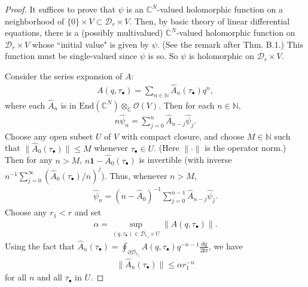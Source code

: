 \documentclass[12pt,a4paper,notitlepage]{article}
\theoremstyle{definition}
\theoremstyle{plain}
\newcommand{\mc}{\mathcal}
\newcommand{\wht}{\widehat}
\newcommand{\ovl}{\overline}
\newcommand{\End}{\mathrm{End}} %
\newcommand{\id}{\mathbf{1}}
\newcommand{\scr}{\mathscr}
\newcommand{\im}{\mathbf{i}}
\newcommand{\mbb}{\mathbb}
\newcommand{\blt}{\bullet}
\newcommand{\Cbb}{\mathbb C}
\numberwithin{equation}{section}
\begin{document}
\begin{proof}
It suffices to prove that $\psi$ is an $\Cbb^N$-valued holomorphic function on a neighborhood of $\{0\}\times V\subset\mc D_r\times V$. Then, by basic theory of linear differential equations, there is a (possibly multivalued) $\Cbb^N$-valued holomorphic function on $\mc D_r\times V$ whose ``initial value" is given by $\psi$. (See \cite{Kna} the remark after Thm. B.1.) This function must be single-valued since $\psi$ is so. So $\psi$ is holomorphic on $\mc D_r\times V$.

Consider the series expansion of $A$:
	\begin{align*}
	A(q,\tau_\blt)=\sum_{n\in\mbb N}\wht A_n(\tau_\blt)q^n,
	\end{align*}
	where each $\wht A_n$ is  in $\End(\Cbb^N)\otimes_\Cbb\scr O(V)$.  Then for each $n\in\mbb N$,
	\begin{align*}
	n\wht\psi_n=\sum_{j=0}^n\wht A_{n-j}\wht\psi_j.
	\end{align*}
	Choose any open subset $U$ of $V$ with compact closure, and choose $M\in\mbb N$ such that $\lVert\wht A_0(\tau_\bullet)\lVert\leq M$ whenever $\tau_\blt\in U$. (Here $\lVert\cdot\lVert$ is the operator norm.) Then for any $n>M$, $n\id-\wht A_0(\tau_\blt)$ is invertible (with inverse $n^{-1}\sum_{j=0}^\infty(\wht A_0(\tau_\blt)/n)^j $). Thus, whenever $n>M$,
	\begin{align}
	\wht\psi_n=(n-\wht A_0)^{-1}\sum_{j=0}^{n-1}\wht A_{n-j}\wht\psi_j.\label{eq73}
	\end{align}
	Choose any $r_1<r$ and set
	\begin{align}
	\alpha=\sup_{(q,\tau_\blt)\in {\ovl{\mc D_{r_1}}\times U}}\lVert A(q,\tau_\blt)\lVert.\label{eq74}
	\end{align}
	Using the fact that $\wht A_n(\tau_\blt)=\oint_{\partial \mc D_{r_1}} A(q,\tau_\blt)q^{-n-1}\frac{dq}{2\im\pi}$, we have
	\begin{align}
	\lVert\wht A_n(\tau_\blt)\lVert \leq \alpha r_1^{-n}\label{eq75}
	\end{align}
	for all $n$ and all  $\tau_\blt$ in $U$.
	

\end{proof}
\end{document}
